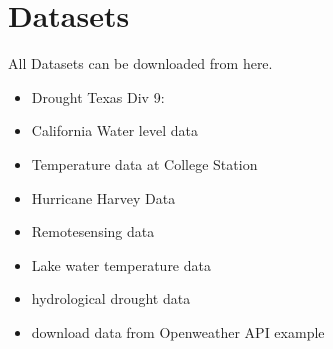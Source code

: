 \section{Datasets}
All Datasets can be downloaded from here.
\begin{itemize}
    \item Drought Texas Div 9: 
    \item California Water level data
    \item Temperature data at College Station
    \item Hurricane Harvey Data
    \item Remotesensing data
    \item Lake water temperature data
    \item hydrological drought data
    \item download data from Openweather API example
\end{itemize}